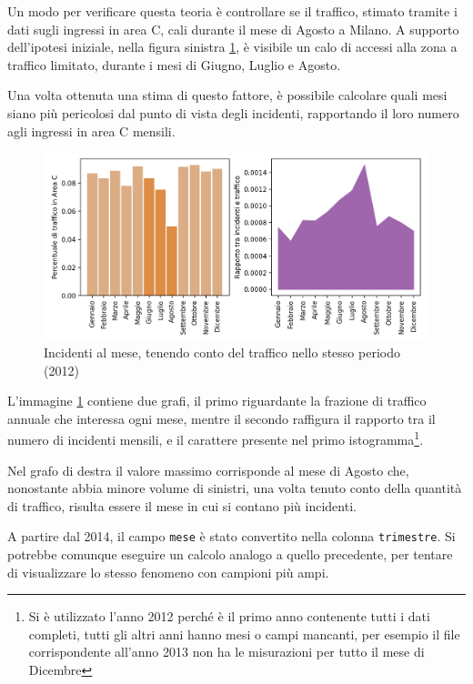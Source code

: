 \documentclass[a4paper,12pt]{report}
\newcommand{\columnstyle}[1]{\texttt{#1}}
\newcommand{\skipline}{\vspace{0.2in}}
\begin{document}
Un modo per verificare questa teoria è controllare se il traffico, 
stimato tramite i dati sugli ingressi in area C, cali durante il mese di 
Agosto a Milano. 
A supporto dell'ipotesi iniziale, nella figura sinistra \ref{fig:incidenti-traffico-mese}, 
è visibile un calo di accessi alla zona a traffico limitato, 
durante i mesi di Giugno, Luglio e Agosto. 

Una volta ottenuta una stima di questo fattore, è possibile calcolare quali mesi 
siano più pericolosi dal punto di vista degli incidenti, 
rapportando il loro numero agli ingressi in area C mensili.

\begin{figure}
    \includegraphics[width=\linewidth]{../src/area_c/rapporto_mese.png}
    \caption{Incidenti al mese, tenendo conto del traffico nello stesso periodo (2012)}
    \label{fig:incidenti-traffico-mese}
\end{figure}

L'immagine \ref{fig:incidenti-traffico-mese} contiene due grafi, 
il primo riguardante la frazione di traffico annuale che interessa ogni mese, 
mentre il secondo raffigura il rapporto tra il numero di incidenti mensili, 
e il carattere presente nel primo
istogramma\footnote{Si è utilizzato l'anno 2012 perché è il primo anno contenente 
tutti i dati completi, tutti gli altri anni hanno mesi o campi mancanti, 
per esempio il file corrispondente all'anno 
2013 non ha le misurazioni per tutto il mese di Dicembre}. 

Nel grafo di destra il valore massimo corrisponde al mese di Agosto 
che, nonostante abbia minore volume di sinistri, 
una volta tenuto conto della quantità di traffico, risulta essere 
il mese in cui si contano più incidenti. 

\skipline
A partire dal 2014, il campo \columnstyle{mese} è stato convertito nella 
colonna \columnstyle{trimestre}. 
Si potrebbe comunque eseguire un calcolo analogo a quello precedente, 
per tentare di visualizzare lo stesso fenomeno con campioni più ampi. 
\end{document}
